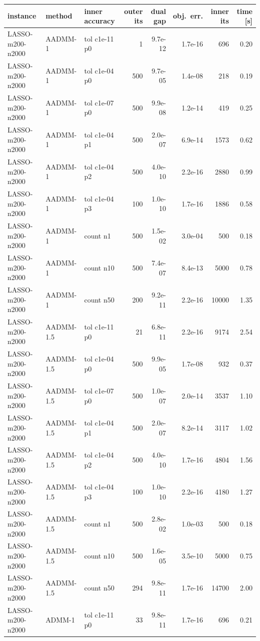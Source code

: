 \begin{tabular}{lllrrrrr}
\toprule
instance & method & inner accuracy & outer its & dual gap & obj.\ err. & inner its & time [s]\\
\midrule
LASSO-m200-n2000 & AADMM-1 & tol c1e-11 p0 & 1 & 9.7e-12 & 1.7e-16 & 696 & 0.20\\
LASSO-m200-n2000 & AADMM-1 & tol c1e-04 p0 & 500 & 9.7e-05 & 1.4e-08 & 218 & 0.19\\
LASSO-m200-n2000 & AADMM-1 & tol c1e-07 p0 & 500 & 9.9e-08 & 1.2e-14 & 419 & 0.25\\
LASSO-m200-n2000 & AADMM-1 & tol c1e-04 p1 & 500 & 2.0e-07 & 6.9e-14 & 1573 & 0.62\\
LASSO-m200-n2000 & AADMM-1 & tol c1e-04 p2 & 500 & 4.0e-10 & 2.2e-16 & 2880 & 0.99\\
LASSO-m200-n2000 & AADMM-1 & tol c1e-04 p3 & 100 & 1.0e-10 & 1.7e-16 & 1886 & 0.58\\
LASSO-m200-n2000 & AADMM-1 & count n1 & 500 & 1.5e-02 & 3.0e-04 & 500 & 0.18\\
LASSO-m200-n2000 & AADMM-1 & count n10 & 500 & 7.4e-07 & 8.4e-13 & 5000 & 0.78\\
LASSO-m200-n2000 & AADMM-1 & count n50 & 200 & 9.2e-11 & 2.2e-16 & 10000 & 1.35\\
LASSO-m200-n2000 & AADMM-1.5 & tol c1e-11 p0 & 21 & 6.8e-11 & 2.2e-16 & 9174 & 2.54\\
LASSO-m200-n2000 & AADMM-1.5 & tol c1e-04 p0 & 500 & 9.9e-05 & 1.7e-08 & 932 & 0.37\\
LASSO-m200-n2000 & AADMM-1.5 & tol c1e-07 p0 & 500 & 1.0e-07 & 2.0e-14 & 3537 & 1.10\\
LASSO-m200-n2000 & AADMM-1.5 & tol c1e-04 p1 & 500 & 2.0e-07 & 8.2e-14 & 3117 & 1.02\\
LASSO-m200-n2000 & AADMM-1.5 & tol c1e-04 p2 & 500 & 4.0e-10 & 1.7e-16 & 4804 & 1.56\\
LASSO-m200-n2000 & AADMM-1.5 & tol c1e-04 p3 & 100 & 1.0e-10 & 2.2e-16 & 4180 & 1.27\\
LASSO-m200-n2000 & AADMM-1.5 & count n1 & 500 & 2.8e-02 & 1.0e-03 & 500 & 0.18\\
LASSO-m200-n2000 & AADMM-1.5 & count n10 & 500 & 1.6e-05 & 3.5e-10 & 5000 & 0.75\\
LASSO-m200-n2000 & AADMM-1.5 & count n50 & 294 & 9.8e-11 & 1.7e-16 & 14700 & 2.00\\
LASSO-m200-n2000 & ADMM-1 & tol c1e-11 p0 & 33 & 9.8e-11 & 1.7e-16 & 696 & 0.21\\

\end{tabular}
